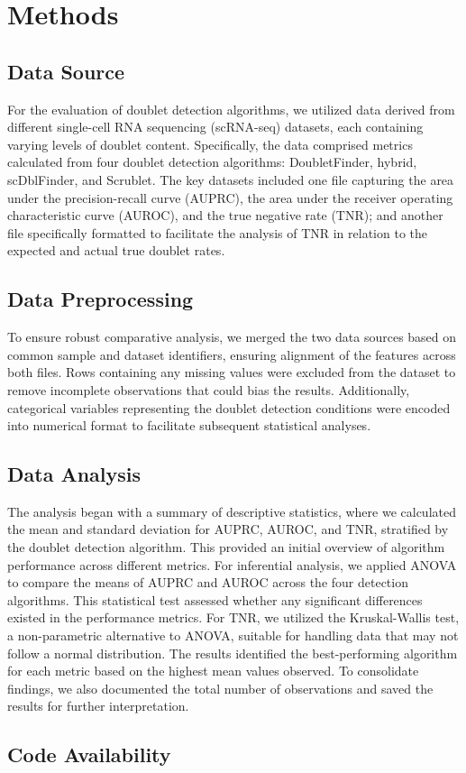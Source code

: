 \documentclass[11pt]{article}
\begin{document}
\section*{Methods}

\subsection*{Data Source}
For the evaluation of doublet detection algorithms, we utilized data derived from different single-cell RNA sequencing (scRNA-seq) datasets, each containing varying levels of doublet content. Specifically, the data comprised metrics calculated from four doublet detection algorithms: DoubletFinder, hybrid, scDblFinder, and Scrublet. The key datasets included one file capturing the area under the precision-recall curve (AUPRC), the area under the receiver operating characteristic curve (AUROC), and the true negative rate (TNR); and another file specifically formatted to facilitate the analysis of TNR in relation to the expected and actual true doublet rates.

\subsection*{Data Preprocessing}
To ensure robust comparative analysis, we merged the two data sources based on common sample and dataset identifiers, ensuring alignment of the features across both files. Rows containing any missing values were excluded from the dataset to remove incomplete observations that could bias the results. Additionally, categorical variables representing the doublet detection conditions were encoded into numerical format to facilitate subsequent statistical analyses.

\subsection*{Data Analysis}
The analysis began with a summary of descriptive statistics, where we calculated the mean and standard deviation for AUPRC, AUROC, and TNR, stratified by the doublet detection algorithm. This provided an initial overview of algorithm performance across different metrics. For inferential analysis, we applied ANOVA to compare the means of AUPRC and AUROC across the four detection algorithms. This statistical test assessed whether any significant differences existed in the performance metrics. For TNR, we utilized the Kruskal-Wallis test, a non-parametric alternative to ANOVA, suitable for handling data that may not follow a normal distribution. The results identified the best-performing algorithm for each metric based on the highest mean values observed. To consolidate findings, we also documented the total number of observations and saved the results for further interpretation.\subsection*{Code Availability}
\end{document}
